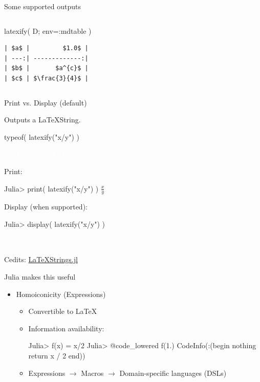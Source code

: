 \documentclass{beamer}
\begin{document}
\begin{frame}[fragile]{Some supported outputs}
\begin{columns}[t]
\begin{column}{0.5\textwidth}
\begin{juliacode}
  latexify( D; env=:mdtable )
\end{juliacode}
  \footnotesize
\begin{verbatim}
| $a$ |         $1.0$ |
| ---:| -------------:|
| $b$ |       $a^{c}$ |
| $c$ | $\frac{3}{4}$ |
\end{verbatim}
\vfill
\end{column}
\end{columns}

\end{frame}


\begin{frame}[fragile]{Print vs. Display (default)}

  \textbullet Outputs a LaTeXString.
  \begin{juliacode}
    typeof( latexify("x/y") )

    ~\large\textcolor{white}{\tiny LaTeXStrings.LaTeXString}~
  \end{juliacode}

  \textbullet Print:
  \begin{juliacode}
    Julia> print( latexify("x/y") )
    $\frac{x}{y}$
  \end{juliacode}

  \textbullet Display (when supported):
  \begin{juliacode}
    Julia> display( latexify("x/y") )

    ~\large\textcolor{white}{$\frac{x}{y}$}~
  \end{juliacode}


  Cedits: \href{https://github.com/stevengj/LaTeXStrings.jl}{LaTeXStrings.jl}


\end{frame}

\begin{frame}[fragile]{Julia makes this useful}
  \begin{itemize}
    \setlength{\itemsep}{3mm}
    \item Homoiconicity (Expressions)
    \begin{itemize}
    \setlength{\itemsep}{3mm}
      \item Convertible to \LaTeX
      \item Information availability:
\begin{juliacode}
  Julia> f(x) = x/2
  Julia> @code_lowered f(1.)
  CodeInfo(:(begin
      nothing
      return x / 2
    end))
\end{juliacode}

\item Expressions $\to$ Macros $\to$ Domain-specific languages (DSLs)
    \end{itemize}

  \end{itemize}

\end{frame}
\end{document}
